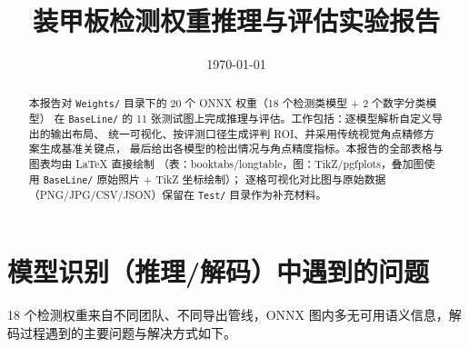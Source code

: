 \documentclass[11pt,a4paper]{ctexart}
\title{\bfseries 装甲板检测权重推理与评估实验报告}
\author{}
\date{\today}
\newcommand{\code}[1]{\texttt{\small #1}}
\begin{document}
\maketitle

\begin{abstract}
\noindent 本报告对 \code{Weights/} 目录下的 20 个 ONNX 权重（18 个检测类模型 + 2 个数字分类模型）
在 \code{BaseLine/} 的 11 张测试图上完成推理与评估。工作包括：逐模型解析自定义导出的输出布局、
统一可视化、按评测口径生成评判 ROI、并采用传统视觉角点精修方案生成基准关键点，
最后给出各模型的检出情况与角点精度指标。本报告的全部表格与图表均由 LaTeX 直接绘制
（表：booktabs/longtable，图：TikZ/pgfplots，叠加图使用 \code{BaseLine/} 原始照片 + TikZ 坐标绘制）；
逐格可视化对比图与原始数据（PNG/JPG/CSV/JSON）保留在 \code{Test/} 目录作为补充材料。
\end{abstract}

\tableofcontents
\vspace{0.5em}

\section{模型识别（推理/解码）中遇到的问题}
18 个检测权重来自不同团队、不同导出管线，ONNX 图内多无可用语义信息，解码过程遇到的主要问题与解决方式如下。
\end{document}
